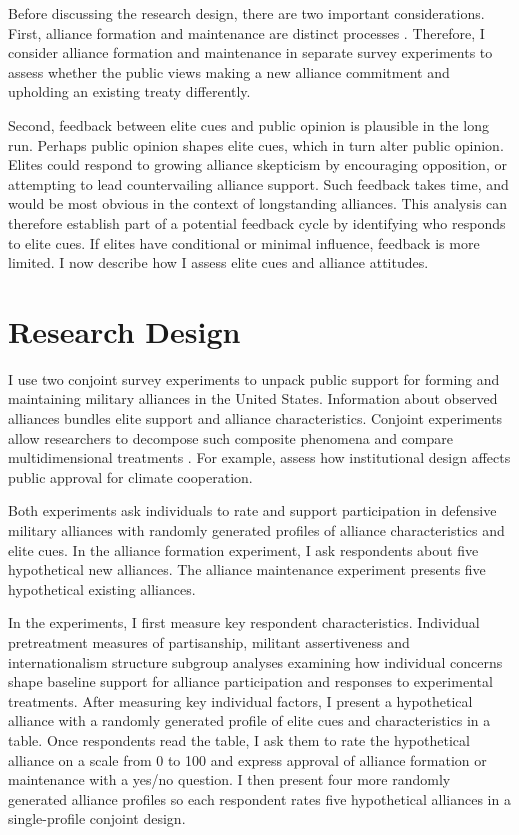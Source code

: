 \documentclass[12pt]{article}
\begin{document}
Before discussing the research design, there are two important considerations. 
First, alliance formation and maintenance are distinct processes \citep{Snyder1997}. 
Therefore, I consider alliance formation and maintenance in separate survey experiments to assess whether the public views making a new alliance commitment and upholding an existing treaty differently. 


Second, feedback between elite cues and public opinion is plausible in the long run. 
Perhaps public opinion shapes elite cues, which in turn alter public opinion. 
Elites could respond to growing alliance skepticism by encouraging opposition, or attempting to lead countervailing alliance support.
Such feedback takes time, and would be most obvious in the context of longstanding alliances.
This analysis can therefore establish part of a potential feedback cycle by identifying who responds to elite cues.  
If elites have conditional or minimal influence, feedback is more limited.
I now describe how I assess elite cues and alliance attitudes. 


\section{Research Design}


I use two conjoint survey experiments to unpack public support for forming and maintaining military alliances in the United States. 
Information about observed alliances bundles elite support and alliance characteristics. 
Conjoint experiments allow researchers to decompose such composite phenomena and compare multidimensional treatments \citep{Hainmuelleretal2014}. 
For example, \citet{BechtelScheve2013} assess how institutional design affects public approval for climate cooperation. 


Both experiments ask individuals to rate and support participation in defensive military alliances with randomly generated profiles of alliance characteristics and elite cues. 
In the alliance formation experiment, I ask respondents about five hypothetical new alliances. 
The alliance maintenance experiment presents five hypothetical existing alliances.


In the experiments, I first measure key respondent characteristics.  
Individual pretreatment measures of partisanship, militant assertiveness and internationalism structure subgroup analyses examining how individual concerns shape baseline support for alliance participation and responses to experimental treatments. 
After measuring key individual factors, I present a hypothetical alliance with a randomly generated profile of elite cues and characteristics in a table.
Once respondents read the table, I ask them to rate the hypothetical alliance on a scale from 0 to 100 and express approval of alliance formation or maintenance with a yes/no question. 
I then present four more randomly generated alliance profiles so each respondent rates five hypothetical alliances in a single-profile conjoint design.
\end{document}
